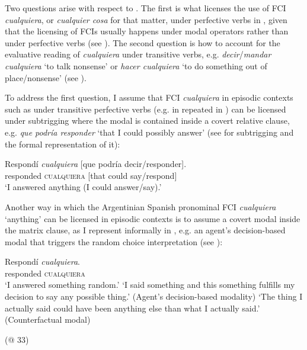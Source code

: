 Two questions arise with respect to . The first is what licenses the use of FCI \textit{cualquiera}, or \textit{cualquier cosa} for that matter, under perfective verbs in , given that the licensing of FCIs usually happens under modal operators rather than under perfective verbs (see ). The second question is how to account for the evaluative reading of \textit{cualquiera} under transitive verbs, e.g. \textit{decir}/\textit{mandar cualquiera} ‘to talk nonsense’ or \textit{hacer cualquiera} ‘to do something out of place/nonsense’ (see ).

To address the first question, I assume that FCI \textit{cualquiera} in episodic contexts such as under transitive perfective verbs (e.g.  in  repeated in ) can be licensed under subtrigging where the modal is contained inside a covert relative clause, e.g. \textit{que podría responder} ‘that I could possibly answer’ (see  for subtrigging and the formal representation of it):

\ea \label{bkm:Ref63461360}  %
\gll Respondí \textit{cualquiera}  [que podría decir/responder].\\
responded \textsc{cualquiera} [that could say/respond]\\
    \glt ‘I answered anything (I could answer/say).’
\z

Another way in which the Argentinian Spanish pronominal FCI \textit{cualquiera} ‘anything’ can be licensed in episodic contexts is to assume a covert modal inside the matrix clause, as I represent informally in , e.g. an agent’s decision-based modal that triggers the random choice interpretation (see ):

\ea \label{bkm:Ref63461220} %
\gll Respondí \textit{cualquiera}.\\
responded \textsc{cualquiera}\\
    \glt ‘I answered something random.’
\ea ‘I said something and this something fulfills my decision to say any possible thing.’
(Agent’s decision-based modality)
\ex ‘The thing I actually said could have been anything else than what I actually said.’ (Counterfactual modal)

    (@ 33)
\z
\z

